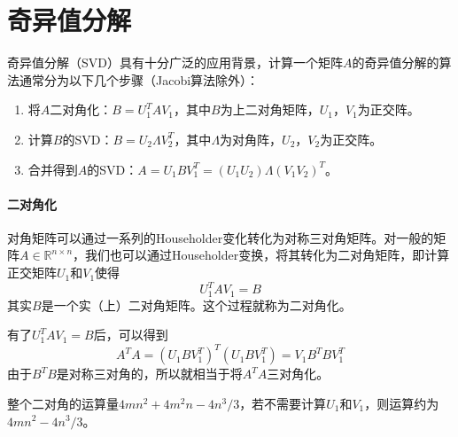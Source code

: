 \documentclass[UTF8]{article}
\begin{document}
\section{奇异值分解}
\begin{flushleft}
奇异值分解（SVD）具有十分广泛的应用背景，计算一个矩阵$A$的奇异值分解的算法通常分为以下几个步骤（Jacobi算法除外）：
\begin{enumerate}[1.]
  \item 将$A$二对角化：$B=U_1^TAV_1$，其中$B$为上二对角矩阵，$U_1$，$V_1$为正交阵。
  \item 计算$B$的SVD：$B=U_2\Lambda V_2^T$，其中$\Lambda$为对角阵，$U_2$，$V_2$为正交阵。
  \item 合并得到$A$的SVD：$A=U_1BV_1^T=(U_1U_2)\Lambda (V_1V_2)^T$。
\end{enumerate}

\paragraph{二对角化}
对角矩阵可以通过一系列的Householder变化转化为对称三对角矩阵。对一般的矩阵$A \in \mathbb{R}^{n \times n}$，我们也可以通过Householder变换，将其转化为二对角矩阵，即计算正交矩阵$U_1$和$V_1$使得
$$U_1^TAV_1=B$$
其实$B$是一个实（上）二对角矩阵。这个过程就称为\textcolor[rgb]{0.00,0.07,1.00}{二对角化}。\newline

有了$U_1^TAV_1=B$后，可以得到
$$A^TA=(U_1BV_1^T)^T(U_1BV_1^T)=V_1B^TBV_1^T$$
由于$B^TB$是对称三对角的，所以就相当于将$A^TA$三对角化。\newline

整个二对角的运算量$4mn^2+4m^2n-4n^3/3$，若不需要计算$U_1$和$V_1$，则运算约为$4mn^2-4n^3/3$。


\end{flushleft}
\end{document}
